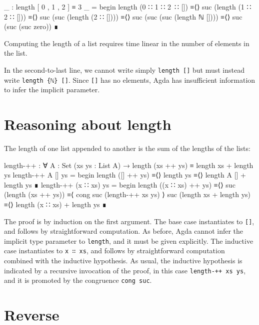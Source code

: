 \begin{fence}
\begin{code}
_ : length [ 0 , 1 , 2 ] ≡ 3
_ =
  begin
    length (0 ∷ 1 ∷ 2 ∷ [])
  ≡⟨⟩
    suc (length (1 ∷ 2 ∷ []))
  ≡⟨⟩
    suc (suc (length (2 ∷ [])))
  ≡⟨⟩
    suc (suc (suc (length {ℕ} [])))
  ≡⟨⟩
    suc (suc (suc zero))
  ∎
\end{code}
\end{fence}

Computing the length of a list requires time linear in the number of
elements in the list.

In the second-to-last line, we cannot write simply
\texttt{length\ {[}{]}} but must instead write
\texttt{length\ \{ℕ\}\ {[}{]}}. Since \texttt{{[}{]}} has no elements,
Agda has insufficient information to infer the implicit parameter.

\hypertarget{reasoning-about-length}{%
\section{Reasoning about length}\label{reasoning-about-length}}

The length of one list appended to another is the sum of the lengths of
the lists:

\begin{fence}
\begin{code}
length-++ : ∀ {A : Set} (xs ys : List A)
  → length (xs ++ ys) ≡ length xs + length ys
length-++ {A} [] ys =
  begin
    length ([] ++ ys)
  ≡⟨⟩
    length ys
  ≡⟨⟩
    length {A} [] + length ys
  ∎
length-++ (x ∷ xs) ys =
  begin
    length ((x ∷ xs) ++ ys)
  ≡⟨⟩
    suc (length (xs ++ ys))
  ≡⟨ cong suc (length-++ xs ys) ⟩
    suc (length xs + length ys)
  ≡⟨⟩
    length (x ∷ xs) + length ys
  ∎
\end{code}
\end{fence}

The proof is by induction on the first argument. The base case
instantiates to \texttt{{[}{]}}, and follows by straightforward
computation. As before, Agda cannot infer the implicit type parameter to
\texttt{length}, and it must be given explicitly. The inductive case
instantiates to \texttt{x\ ∷\ xs}, and follows by straightforward
computation combined with the inductive hypothesis. As usual, the
inductive hypothesis is indicated by a recursive invocation of the
proof, in this case \texttt{length-++\ xs\ ys}, and it is promoted by
the congruence \texttt{cong\ suc}.

\hypertarget{reverse}{%
\section{Reverse}\label{reverse}}

